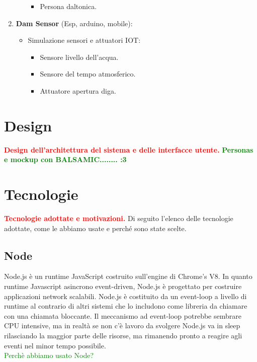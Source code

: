 \documentclass{article}
\begin{document}
\begin{enumerate}
\begin{itemize}
\begin{itemize}
			\item Persona daltonica.
		\end{itemize}
	\end{itemize}
	\item \textbf{Dam Sensor} (Esp, arduino, mobile):
	\begin{itemize}
		\item Simulazione sensori e attuatori IOT:
		\begin{itemize}
			\item Sensore livello dell'acqua.
			\item Sensore del tempo atmosferico.
			\item Attuatore apertura diga.
		\end{itemize}
	\end{itemize}
\end{enumerate}

\section{Design}
\textcolor{red}{\textbf{Design dell'architettura del sistema e delle interfacce utente.}}
\textcolor{green}{\textbf{Personas e mockup con BALSAMIC........ :3}}

\section{Tecnologie}
\textcolor{red}{\textbf{Tecnologie adottate e motivazioni.}}
Di seguito l'elenco delle tecnologie adottate, come le abbiamo usate e perché sono state scelte.
\subsection{Node}
Node.js è un runtime JavaScript costruito sull'engine di Chrome's V8.
In quanto runtime Javascript asincrono event-driven, Node.js è progettato per costruire applicazioni network scalabili. Node.js è costituito da un event-loop a livello di runtime al contrario di altri sistemi che lo includono come libreria da chiamare con una chiamata bloccante. Il meccanismo ad event-loop potrebbe sembrare CPU intensive, ma in realtà se non c'è lavoro da svolgere Node.js va in sleep rilasciando la maggior parte delle risorse, ma rimanendo pronto a reagire agli eventi nel minor tempo possibile.
\\
\textcolor{green}{Perchè abbiamo usato Node?}
\end{document}
